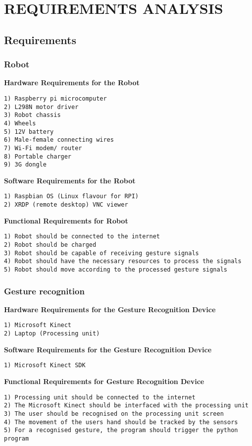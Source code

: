 
\chapter{REQUIREMENTS ANALYSIS} %

\section{Requirements}
\subsection{Robot}
\textbf{Hardware Requirements for the Robot}
\begin{verbatim}
1) Raspberry pi microcomputer
2) L298N motor driver
3) Robot chassis
4) Wheels 
5) 12V battery
6) Male-female connecting wires
7) Wi-Fi modem/ router
8) Portable charger
9) 3G dongle
\end{verbatim}
\textbf{Software Requirements for the Robot}
\begin{verbatim}
1) Raspbian OS (Linux flavour for RPI)
2) XRDP (remote desktop) VNC viewer 
\end{verbatim}
\textbf{Functional Requirements for Robot}
\begin{verbatim}
1) Robot should be connected to the internet
2) Robot should be charged
3) Robot should be capable of receiving gesture signals
4) Robot should have the necessary resources to process the signals
5) Robot should move according to the processed gesture signals
\end{verbatim}
\subsection{Gesture recognition}
\textbf{Hardware Requirements for the Gesture Recognition Device}
\begin{verbatim}
1) Microsoft Kinect 
2) Laptop (Processing unit)
\end{verbatim}
\textbf{Software Requirements for the Gesture Recognition Device}
\begin{verbatim}
1) Microsoft Kinect SDK 
\end{verbatim}
\textbf{Functional Requirements for Gesture Recognition Device}
\begin{verbatim}
1) Processing unit should be connected to the internet
2) The Microsoft Kinect should be interfaced with the processing unit
3) The user should be recognised on the processing unit screen
4) The movement of the users hand should be tracked by the sensors
5) For a recognised gesture, the program should trigger the python program
\end{verbatim}
